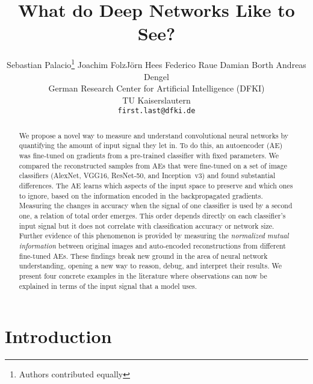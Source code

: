\documentclass[10pt,twocolumn,a4paper]{article}
\begin{document}
\title{What do Deep Networks Like to See?}

\author{Sebastian Palacio\thanks{Authors contributed equally} \quad Joachim Folz\footnotemark[1] \quad Jörn Hees \quad Federico Raue \quad Damian Borth \quad Andreas Dengel \\
German Research Center for Artificial Intelligence (DFKI)\\
TU Kaiserslautern \\
\texttt{first.last@dfki.de}}

\maketitle

\begin{abstract}
	We propose a novel way to measure and understand convolutional neural networks by quantifying the amount of input signal they let in.
	To do this, an autoencoder (AE) was fine-tuned on gradients from a pre-trained classifier with fixed parameters.
	We compared the reconstructed samples from AEs that were fine-tuned on a set of image classifiers (AlexNet, VGG16, ResNet-50, and Inception~v3) and found substantial differences.
	The AE learns which aspects of the input space to preserve and which ones to ignore, based on the information encoded in the backpropagated gradients.
	Measuring the changes in accuracy when the signal of one classifier is used by a second one, a relation of total order emerges.
	This order depends directly on each classifier's input signal but it does not correlate with classification accuracy or network size.
	Further evidence of this phenomenon is provided by measuring the \textit{normalized mutual information} between original images and auto-encoded reconstructions from different fine-tuned AEs.
	These findings break new ground in the area of neural network understanding, opening a new way to reason, debug, and interpret their results.
	We present four concrete examples in the literature where observations can now be explained in terms of the input signal that a model uses.
\end{abstract}


\section{Introduction}
\end{document}
